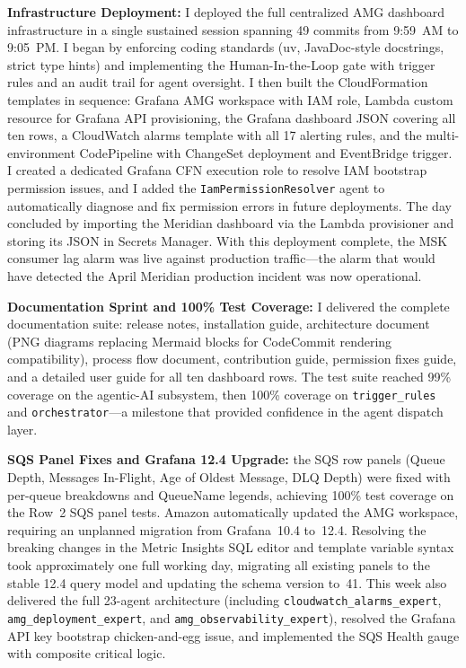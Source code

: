\textbf{Infrastructure Deployment:} 
I
deployed the full centralized AMG dashboard infrastructure in a single sustained
session spanning 49 commits from 9:59~AM to 9:05~PM. I began by enforcing
coding standards (uv, JavaDoc-style docstrings,
strict type hints) and implementing the Human-In-the-Loop gate
with trigger rules and an audit trail for agent oversight. I then
built the CloudFormation templates in sequence: Grafana AMG workspace
with IAM role, Lambda custom resource for Grafana API provisioning,
the Grafana dashboard JSON covering all ten rows, a CloudWatch alarms
template with all 17 alerting rules, and the multi-environment
CodePipeline with ChangeSet deployment and EventBridge trigger.
I created a dedicated Grafana CFN execution role to resolve
IAM bootstrap permission issues, and I added the \texttt{IamPermissionResolver}
agent to automatically diagnose and fix permission errors
in future deployments. The day concluded by importing the Meridian
dashboard via the Lambda provisioner and storing its JSON in
Secrets Manager. With this deployment complete, the MSK consumer lag
alarm was live against production traffic---the alarm that would
have detected the April Meridian production incident was now operational.

\textbf{Documentation Sprint and 100\% Test Coverage:} 
I delivered the complete documentation suite: release notes,
installation guide, architecture document (PNG diagrams replacing
Mermaid blocks for CodeCommit rendering compatibility), process flow
document, contribution guide, permission fixes guide, and a detailed
user guide for all ten dashboard rows. The test suite
reached 99\% coverage on the agentic-AI subsystem, then 100\%
coverage on \texttt{trigger\_rules} and \texttt{orchestrator}---a
milestone that provided confidence in the agent dispatch layer.

\textbf{SQS Panel Fixes and Grafana 12.4 Upgrade:} 
the SQS row panels (Queue Depth, Messages In-Flight,
Age of Oldest Message, DLQ Depth) were fixed with per-queue
breakdowns and QueueName legends, achieving 100\% test coverage
on the Row~2 SQS panel tests. Amazon automatically updated the AMG workspace,
requiring an unplanned migration from Grafana~10.4 to~12.4.
Resolving the breaking changes in the Metric Insights SQL
editor and template variable syntax took approximately one full
working day, migrating all existing panels to the
stable 12.4 query model and updating the schema version to~41.
This week also delivered the full 23-agent architecture
(including \texttt{cloudwatch\_alarms\_expert},
\texttt{amg\_deployment\_expert}, and \texttt{amg\_observability\_expert}),
resolved the Grafana API key bootstrap chicken-and-egg issue,
and implemented the SQS Health gauge with composite critical logic.

